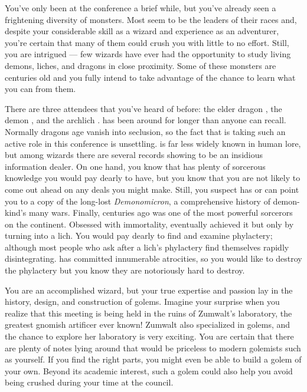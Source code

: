 \documentclass[char]{guildcamp2}
\begin{document}
You've only been at the conference a brief while, but you've already seen a frightening diversity of monsters. Most seem to be the leaders of their races and, despite your considerable skill as a wizard and experience as an adventurer, you're certain that many of them could crush you with little to no effort. Still, you are intrigued --- few wizards have ever had the opportunity to study living demons, liches, and dragons in close proximity. Some of these monsters are centuries old and you fully intend to take advantage of the chance to learn what you can from them.

There are three attendees that you've heard of before: the elder dragon \cOnyx{}, the demon \cDemon{\intro}, and the archlich \cLich{\intro}. \cOnyx{} has been around for longer than anyone can recall. Normally dragons \cOnyx{\their} age vanish into seclusion, so the fact that \cOnyx{\they} is taking such an active role in this conference is unsettling. \cDemon{} is far less widely known in human lore, but among wizards there are several records showing \cDemon{\them} to be an insidious information dealer. On one hand, you know that \cDemon{\they} has plenty of sorcerous knowledge you would pay dearly to have, but you know that you are not likely to come out ahead on any deals you might make. Still, you suspect \cDemon{} has or can point you to a copy of the long-lost \emph{Demonomicron}, a comprehensive history of demon-kind's many wars. Finally, centuries ago \cLich{} was one of the most powerful sorcerors on the continent. Obsessed with immortality, \cLich{\they} eventually achieved it but only by turning into a lich. You would pay dearly to find and examine \cLich{\their} phylactery; although most people who ask after a lich's phylactery find themselves rapidly disintegrating. \cLich{} has committed innumerable atrocities, so you would like to destroy the phylactery but you know they are notoriously hard to destroy.

You are an accomplished wizard, but your true expertise and passion lay in the history, design, and construction of golems. Imagine your surprise when you realize that this meeting is being held in the ruins of Zumwalt's laboratory, the greatest gnomish artificer ever known! Zumwalt also specialized in golems, and the chance to explore her laboratory is very exciting. You are certain that there are plenty of notes lying around that would be priceless to modern golemists such as yourself. If you find the right parts, you might even be able to build a golem of your own. Beyond its academic interest, such a golem could also help you avoid being crushed during your time at the council.
\end{document}
